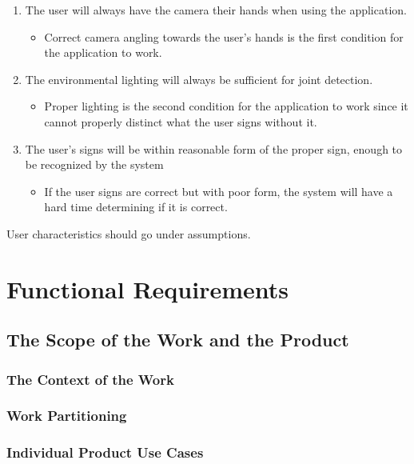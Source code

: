 \documentclass[12pt, titlepage]{article}
\begin{document}
\begin{enumerate}
    \item The user will always have the camera their hands when using the application.
    \begin{itemize}
        \item[] Correct camera angling towards the user's hands is the first condition for the application to work.
    \end{itemize}
    \item The environmental lighting will always be sufficient for joint detection.
    \begin{itemize}
        \item[] Proper lighting is the second condition for the application to work since it cannot properly distinct what the user signs without it.
    \end{itemize}
    \item The user's signs will be within reasonable form of the proper sign, enough to be recognized by the system
    \begin{itemize}
        \item[] If the user signs are correct but with poor form, the system will have a hard time determining if it is correct.
    \end{itemize}
\end{enumerate}


User characteristics should go under assumptions.

\newpage

\section{Functional Requirements}

\subsection{The Scope of the Work and the Product}

\subsubsection{The Context of the Work}

\subsubsection{Work Partitioning}

\subsubsection{Individual Product Use Cases}
\end{document}

